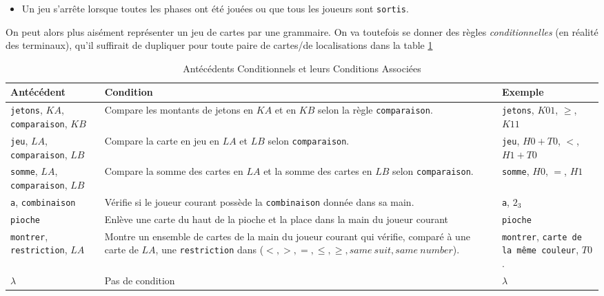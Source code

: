 \documentclass{cours}
\begin{document}
\begin{definition}
\begin{itemize}
\begin{enumerate}
            \item Il est \texttt{sorti} du jeu, il a perdu la partie et ne peut plus jouer\footnote{Dommage pour lui...}.
            \item Il a \texttt{gagné} la partie, auquel cas la partie s'arrête.
        \end{enumerate}
        Une phase se termine lorsque tous les joueurs ont \texttt{fini} ou sont \texttt{sortis}. Tant qu'il reste des joueurs à la \texttt{suite}, on reboucle sur la liste des joueurs. 
        \item Un jeu s'arrête lorsque toutes les phases ont été jouées ou que tous les joueurs sont \texttt{sortis}.
    \end{itemize}    
\end{definition}

On peut alors plus aisément représenter un jeu de cartes par une grammaire. On va toutefois se donner des règles \textit{conditionnelles} (en réalité des terminaux), qu'il suffirait de dupliquer pour toute paire de cartes/de localisations dans la table \ref{table:code_ant}
\begin{table}
    \caption{Antécédents Conditionnels et leurs Conditions Associées}
    \begin{tabular}{>{\centering}m{.2\linewidth}>{\centering}m{.5\linewidth}>{\centering\arraybackslash}m{.2\linewidth}}
        \toprule 
        Antécédent & Condition & Exemple\\
        \midrule \midrule
        \texttt{jetons}, $KA$, \texttt{comparaison}, $KB$ & Compare les montants de jetons en $KA$ et en $KB$ selon la règle \texttt{comparaison}. & \texttt{jetons}, $K01$, $\geq$, $K11$\\
        \midrule
        \texttt{jeu}, $LA$, \texttt{comparaison}, $LB$ & Compare la carte en jeu en $LA$ et $LB$ selon \texttt{comparaison}. & \texttt{jeu}, $H0 + T0$, $<$, $H1 + T0$\\
        \midrule
        \texttt{somme}, $LA$, \texttt{comparaison}, $LB$ & Compare la somme des cartes en $LA$ et la somme des cartes en $LB$ selon \texttt{comparaison}. & \texttt{somme}, $H0$, $=$, $H1$\\
        \midrule 
        \texttt{a}, \texttt{combinaison} & Vérifie si le joueur courant possède la \texttt{combinaison} donnée dans sa main. & \texttt{a}, $2_{3}$\\
        \midrule 
        \texttt{pioche} & Enlève une carte du haut de la pioche et la place dans la main du joueur courant & \texttt{pioche}\\
        \midrule
        \texttt{montrer}, \texttt{restriction}, $LA$ & Montre un ensemble de cartes de la main du joueur courant qui vérifie, comparé à une carte de $LA$, une \texttt{restriction} dans ($<, >, =, \leq, \geq, same \ suit, same \ number$). & \texttt{montrer}, \texttt{carte de la même couleur}, $T0$.\\
        \midrule
        $\lambda$ & Pas de condition & $\lambda$\\
        \bottomrule  
    \end{tabular}
    \label{table:code_ant}
\end{table}
\end{document}
